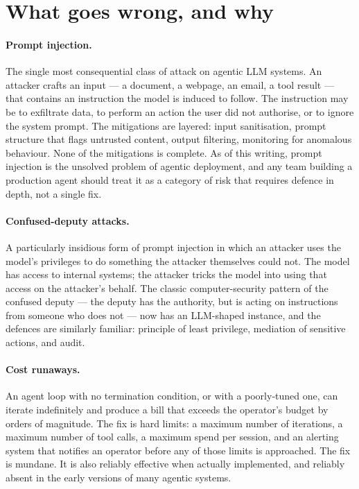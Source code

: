 \section{What goes wrong, and why}

\paragraph{Prompt injection.} The single most consequential
class of attack on agentic LLM systems. An attacker crafts an
input --- a document, a webpage, an email, a tool result ---
that contains an instruction the model is induced to follow.
The instruction may be to exfiltrate data, to perform an
action the user did not authorise, or to ignore the system
prompt. The mitigations are layered: input sanitisation,
prompt structure that flags untrusted content, output
filtering, monitoring for anomalous behaviour. None of the
mitigations is complete. As of this writing, prompt injection
is the unsolved problem of agentic deployment, and any team
building a production agent should treat it as a category of
risk that requires defence in depth, not a single fix.

\paragraph{Confused-deputy attacks.} A particularly insidious
form of prompt injection in which an attacker uses the
model's privileges to do something the attacker themselves
could not. The model has access to internal systems; the
attacker tricks the model into using that access on the
attacker's behalf. The classic computer-security pattern of
the confused deputy --- the deputy has the authority, but is
acting on instructions from someone who does not --- now has
an LLM-shaped instance, and the defences are similarly
familiar: principle of least privilege, mediation of
sensitive actions, and audit.

\paragraph{Cost runaways.} An agent loop with no termination
condition, or with a poorly-tuned one, can iterate indefinitely
and produce a bill that exceeds the operator's budget by
orders of magnitude. The fix is hard limits: a maximum number
of iterations, a maximum number of tool calls, a maximum
spend per session, and an alerting system that notifies an
operator before any of those limits is approached. The fix is
mundane. It is also reliably effective when actually
implemented, and reliably absent in the early versions of
many agentic systems.

